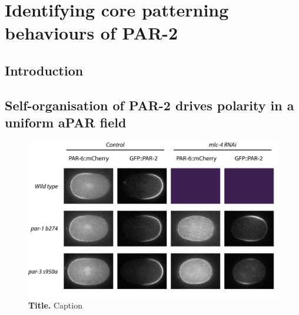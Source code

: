 \documentclass[12pt]{"article"}
\newcommand{\mycaption}[2]{\caption[#1]{\textbf{#1.} #2}}
\begin{document}
\clearpage
\section{Identifying core patterning behaviours of PAR-2}

\subsection{Introduction}


\subsection{Self-organisation of PAR-2 drives polarity in a uniform aPAR field}

\begin{figure}[!h]
\includegraphics[scale=0.9]{uniform_polarity}
\setlength{\abovecaptionskip}{20pt}
\centering
\mycaption{Title}{Caption}
\label{fig:uniform_polarity}
\end{figure}
\end{document}
